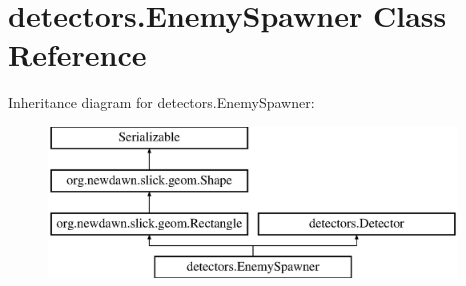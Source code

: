 \hypertarget{classdetectors_1_1_enemy_spawner}{}\section{detectors.\+Enemy\+Spawner Class Reference}
\label{classdetectors_1_1_enemy_spawner}
Inheritance diagram for detectors.\+Enemy\+Spawner\+:\begin{figure}[H]
\begin{center}
\leavevmode
\includegraphics[height=4.000000cm]{classdetectors_1_1_enemy_spawner}
\end{center}
\end{figure}
